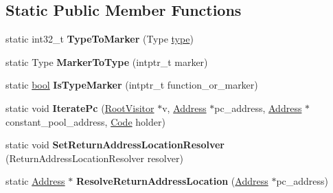 \subsection*{Static Public Member Functions}
\begin{DoxyCompactItemize}
\item 
\mbox{\label{classv8_1_1internal_1_1StackFrame_abfd43314c3e2c9cb920568d2613cb3de}} 
static int32\+\_\+t {\bfseries Type\+To\+Marker} (Type \mbox{\hyperlink{classstd_1_1conditional_1_1type}{type}})
\item 
\mbox{\label{classv8_1_1internal_1_1StackFrame_adf1dfc677ab4ee393b29b9cebe915f53}} 
static Type {\bfseries Marker\+To\+Type} (intptr\+\_\+t marker)
\item 
\mbox{\label{classv8_1_1internal_1_1StackFrame_a57e543e69f916c6f1bae1a01d366dd31}} 
static \mbox{\hyperlink{classbool}{bool}} {\bfseries Is\+Type\+Marker} (intptr\+\_\+t function\+\_\+or\+\_\+marker)
\item 
\mbox{\label{classv8_1_1internal_1_1StackFrame_a3c4daaf3ec791b146b3ec605fe3a3649}} 
static void {\bfseries Iterate\+Pc} (\mbox{\hyperlink{classv8_1_1internal_1_1RootVisitor}{Root\+Visitor}} $\ast$v, \mbox{\hyperlink{classuintptr__t}{Address}} $\ast$pc\+\_\+address, \mbox{\hyperlink{classuintptr__t}{Address}} $\ast$constant\+\_\+pool\+\_\+address, \mbox{\hyperlink{classv8_1_1internal_1_1Code}{Code}} holder)
\item 
\mbox{\label{classv8_1_1internal_1_1StackFrame_ad4eb34e123a01977508d6d94be76d61f}} 
static void {\bfseries Set\+Return\+Address\+Location\+Resolver} (Return\+Address\+Location\+Resolver resolver)
\item 
\mbox{\label{classv8_1_1internal_1_1StackFrame_aa5a56ac2eb1e045eb6c970fcd6c82398}} 
static \mbox{\hyperlink{classuintptr__t}{Address}} $\ast$ {\bfseries Resolve\+Return\+Address\+Location} (\mbox{\hyperlink{classuintptr__t}{Address}} $\ast$pc\+\_\+address)
\end{DoxyCompactItemize}
